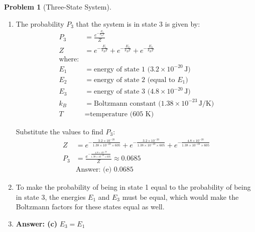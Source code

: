 \documentclass[12pt]{article}
\theoremstyle{definition} %
\newtheorem{problem}{Problem}
\theoremstyle{plain} %
\begin{document}
\begin{problem}[Three-State System]
    \noindent
    \begin{enumerate}
        \item 
        The probability \( P_3 \) that the system is in state 3 is given by:
        \begin{align*}
        P_3 &= \frac{e^{-\frac{E_3}{k_B T}}}{Z} \\
        Z &= e^{-\frac{E_1}{k_B T}} + e^{-\frac{E_2}{k_B T}} + e^{-\frac{E_3}{k_B T}} \\
        \text{where:} \\
        E_1 &= \text{energy of state 1 (} 3.2 \times 10^{-20} \, \text{J)} \\
        E_2 &= \text{energy of state 2 (equal to } E_1 \text{)} \\
        E_3 &= \text{energy of state 3 (} 4.8 \times 10^{-20} \, \text{J)} \\
        k_B &= \text{Boltzmann constant (} 1.38 \times 10^{-23} \, \text{J/K)} \\
        T &= \text{temperature (605 K)}
        \end{align*}

        Substitute the values to find \( P_3 \):
        \begin{align*}
        Z &= e^{-\frac{3.2 \times 10^{-20}}{1.38 \times 10^{-23} \times 605}} + e^{-\frac{3.2 \times 10^{-20}}{1.38 \times 10^{-23} \times 605}} + e^{-\frac{4.8 \times 10^{-20}}{1.38 \times 10^{-23} \times 605}} \\
        P_3 &= \frac{e^{-\frac{4.8 \times 10^{-20}}{1.38 \times 10^{-23} \times 605}}}{Z} \approx 0.0685 \\
        &\text{Answer: (e) } 0.0685
        \end{align*}

        \item 
        To make the probability of being in state 1 equal to the probability of being in state 3, the energies \( E_1 \) and \( E_3 \) must be equal, which would make the Boltzmann factors for these states equal as well.

        \item 
        \textbf{Answer: (c) } \( E_3 = E_1 \)
    \end{enumerate}
\end{problem}
\end{document}
